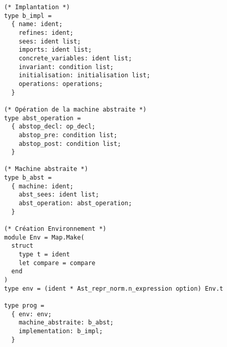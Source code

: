 \begin{small}
\begin{verbatim}
(* Implantation *)
type b_impl =
  { name: ident;
    refines: ident;
    sees: ident list;
    imports: ident list;
    concrete_variables: ident list;
    invariant: condition list;
    initialisation: initialisation list;
    operations: operations;
  }

(* Opération de la machine abstraite *)
type abst_operation =
  { abstop_decl: op_decl;
    abstop_pre: condition list;
    abstop_post: condition list;
  }

(* Machine abstraite *)
type b_abst =
  { machine: ident;
    abst_sees: ident list;
    abst_operation: abst_operation;
  }

(* Création Environnement *)
module Env = Map.Make(
  struct
    type t = ident
    let compare = compare
  end
)
type env = (ident * Ast_repr_norm.n_expression option) Env.t

type prog =
  { env: env;
    machine_abstraite: b_abst;
    implementation: b_impl;
  }

\end{verbatim}
\end{small}
